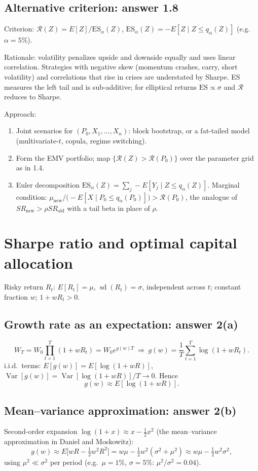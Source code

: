 \documentclass[11pt,letterpaper]{article}
\newcommand{\SRo}{SR_{\mathrm{old}}}
\newcommand{\SRn}{SR_{\mathrm{new}}}
\begin{document}
\subsection*{Alternative criterion: answer 1.8}
Criterion: $\mathcal R(Z)=E[Z]/\mathrm{ES}_\alpha(Z)$, $\mathrm{ES}_\alpha(Z)=-E[Z\mid Z\le q_\alpha(Z)]$ (e.g.\ $\alpha=5\%$).

Rationale: volatility penalizes upside and downside equally and uses linear correlation. Strategies with negative skew (momentum crashes, carry, short volatility) and correlations that rise in crises are understated by Sharpe. ES measures the left tail and is sub-additive; for elliptical returns $\mathrm{ES}\propto\sigma$ and $\mathcal R$ reduces to Sharpe.

Approach:
\begin{enumerate}\setlength{\itemsep}{1pt}
\item Joint scenarios for $(P_0,X_1,\dots,X_n)$: block bootstrap, or a fat-tailed model (multivariate-$t$, copula, regime switching).
\item Form the EMV portfolio; map $\{\mathcal R(Z)>\mathcal R(P_0)\}$ over the parameter grid as in 1.4.
\item Euler decomposition $\mathrm{ES}_\alpha(Z)=\sum_j-E[Y_j\mid Z\le q_\alpha(Z)]$. Marginal condition: $\mu_{\mathrm{new}}/\big(-E[X\mid P_0\le q_\alpha(P_0)]\big)>\mathcal R(P_0)$, the analogue of $\SRn>\rho\SRo$ with a tail beta in place of $\rho$.
\end{enumerate}

\section{Sharpe ratio and optimal capital allocation}
Risky return $R_t$: $E[R_t]=\mu$, $\operatorname{sd}(R_t)=\sigma$, independent across $t$; constant fraction $w$; $1+wR_t>0$.

\subsection*{Growth rate as an expectation: answer 2(a)}
\[
W_T=W_0\prod_{t=1}^T(1+wR_t)=W_0e^{g(w)T}\ \Rightarrow\ g(w)=\frac1T\sum_{t=1}^T\log(1+wR_t).
\]
i.i.d.\ terms: $E[g(w)]=E[\log(1+wR)]$, $\operatorname{Var}[g(w)]=\operatorname{Var}[\log(1+wR)]/T\to0$. Hence
\[
g(w)\approx E[\log(1+wR)] .
\]

\subsection*{Mean--variance approximation: answer 2(b)}
Second-order expansion $\log(1+x)\approx x-\frac12x^2$ (the mean--variance approximation in Daniel and Moskowitz):
\[
g(w)\approx E\big[wR-\tfrac12w^2R^2\big]=w\mu-\tfrac12w^2(\sigma^2+\mu^2)\approx w\mu-\tfrac12w^2\sigma^2,
\]
using $\mu^2\ll\sigma^2$ per period (e.g.\ $\mu=1\%$, $\sigma=5\%$: $\mu^2/\sigma^2=0.04$).
\end{document}
